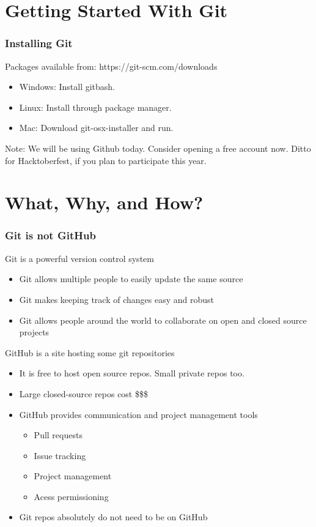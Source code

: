 \documentclass[unknownkeysallowed]{beamer}
\begin{document}
\section{Getting Started With Git}
\begin{frame}
    \frametitle{Installing Git}
    Packages available from: https://git-scm.com/downloads
    \vspace{0.5cm}
    \begin{itemize}
        \item{Windows: Install gitbash.}
        \item{Linux: Install through package manager.}
        \item{Mac: Download git-osx-installer and run. }
    \end{itemize}
    \vspace{0.5cm}
    Note: We will be using Github today. Consider opening a free account now.
    Ditto for Hacktoberfest, if you plan to participate this year.
\end{frame}


\section{What, Why, and How?}
\begin{frame}
    \frametitle{Git is not GitHub}
    \vspace{0.5cm} %
    Git is a powerful version control system
            \begin{itemize}
                \item{Git allows multiple people to easily update the same source}
                \item{Git makes keeping track of changes easy and robust}
       		\item{Git allows people around the world to collaborate on open and closed source projects}
            \end{itemize}
    \vspace{0.25cm}
    GitHub is a site hosting some git repositories
            \begin{itemize}
		\item{It is free to host open source repos. Small private repos too.}
                \item{Large closed-source repos cost \$\$\$}
        	\item{GitHub provides communication and project management tools}
	        \begin{itemize}
		    \item{Pull requests}
		    \item{Issue tracking}
		    \item{Project management}
		    \item{Acess permissioning}
		\end{itemize}
    \vspace{0.25cm}
	\item{Git repos absolutely do not need to be on GitHub}
    \end{itemize}
\end{frame}
\end{document}
